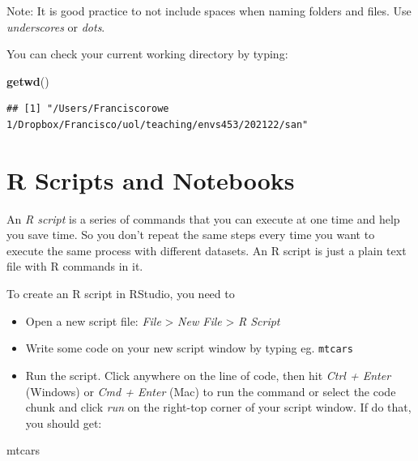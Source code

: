 \documentclass[
]{book}
\newenvironment{Shaded}{\begin{snugshade}}{\end{snugshade}}
\newcommand{\KeywordTok}[1]{\textcolor[rgb]{0.13,0.29,0.53}{\textbf{#1}}}
\newcommand{\NormalTok}[1]{#1}
\begin{document}
Note: It is good practice to not include spaces when naming folders and files. Use \emph{underscores} or \emph{dots}.

You can check your current working directory by typing:

\begin{Shaded}
\begin{Highlighting}[]
\KeywordTok{getwd}\NormalTok{()}
\end{Highlighting}
\end{Shaded}

\begin{verbatim}
## [1] "/Users/Franciscorowe 1/Dropbox/Francisco/uol/teaching/envs453/202122/san"
\end{verbatim}

\hypertarget{r-scripts-and-notebooks}{%
\section{R Scripts and Notebooks}\label{r-scripts-and-notebooks}}

An \emph{R script} is a series of commands that you can execute at one time and help you save time. So you don't repeat the same steps every time you want to execute the same process with different datasets. An R script is just a plain text file with R commands in it.

To create an R script in RStudio, you need to

\begin{itemize}
\item
  Open a new script file: \emph{File} \textgreater{} \emph{New File} \textgreater{} \emph{R Script}
\item
  Write some code on your new script window by typing eg. \texttt{mtcars}
\item
  Run the script. Click anywhere on the line of code, then hit \emph{Ctrl + Enter} (Windows) or \emph{Cmd + Enter} (Mac) to run the command or select the code chunk and click \emph{run} on the right-top corner of your script window. If do that, you should get:
\end{itemize}

\begin{Shaded}
\begin{Highlighting}[]
\NormalTok{mtcars}
\end{Highlighting}
\end{Shaded}
\end{document}
